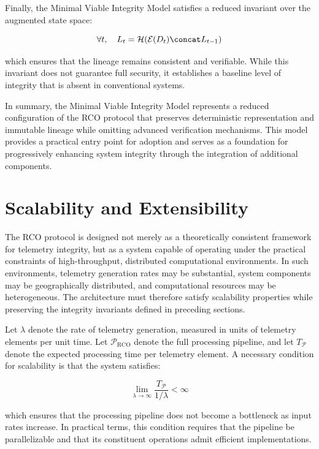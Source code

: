 Finally, the Minimal Viable Integrity Model satisfies a reduced invariant over the augmented state space:

\begin{equation}
\forall t, \quad L_t = \mathcal{H}(\mathcal{E}(D_t) \concat L_{t-1})
\end{equation}

which ensures that the lineage remains consistent and verifiable. While this invariant does not guarantee full security, it establishes a baseline level of integrity that is absent in conventional systems.

In summary, the Minimal Viable Integrity Model represents a reduced configuration of the RCO protocol that preserves deterministic representation and immutable lineage while omitting advanced verification mechanisms. This model provides a practical entry point for adoption and serves as a foundation for progressively enhancing system integrity through the integration of additional components.

\section{Scalability and Extensibility}

The RCO protocol is designed not merely as a theoretically consistent framework for telemetry integrity, but as a system capable of operating under the practical constraints of high-throughput, distributed computational environments. In such environments, telemetry generation rates may be substantial, system components may be geographically distributed, and computational resources may be heterogeneous. The architecture must therefore satisfy scalability properties while preserving the integrity invariants defined in preceding sections.

Let $\lambda$ denote the rate of telemetry generation, measured in units of telemetry elements per unit time. Let $\mathcal{P}_{\text{RCO}}$ denote the full processing pipeline, and let $T_{\mathcal{P}}$ denote the expected processing time per telemetry element. A necessary condition for scalability is that the system satisfies:

\begin{equation}
\lim_{\lambda \to \infty} \frac{T_{\mathcal{P}}}{1/\lambda} < \infty
\end{equation}

which ensures that the processing pipeline does not become a bottleneck as input rates increase. In practical terms, this condition requires that the pipeline be parallelizable and that its constituent operations admit efficient implementations.

